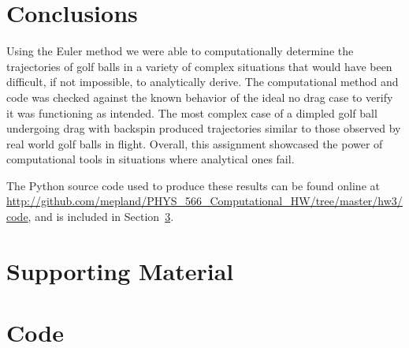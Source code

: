 \documentclass[notitlepage,aps,prd,nofootinbib]{revtex4-1}
\begin{document}
\section{Conclusions}
\label{sec:Conclusions}
Using the Euler method we were able to computationally determine the trajectories of golf balls in a variety of complex situations that would have been difficult, if not impossible, to analytically derive. The computational method and code was checked against the known behavior of the ideal no drag case to verify it was functioning as intended. The most complex case of a dimpled golf ball undergoing drag with backspin produced trajectories similar to those observed by real world golf balls in flight. Overall, this assignment showcased the power of computational tools in situations where analytical ones fail.

The Python source code used to produce these results can be found online at \url{http://github.com/mepland/PHYS_566_Computational_HW/tree/master/hw3/code}, and is included in Section~\ref{sec:code}.

\clearpage
\section{Supporting Material}
\label{sec:Supporting_Material}


\clearpage


\clearpage
\section{Code}
\label{sec:code}


\end{document}
